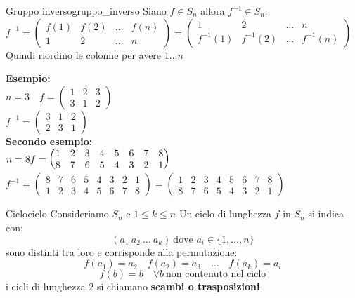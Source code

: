 \documentclass[12pt, letterpaper]{report}
\newcounter{definition}
\newcommand{\nmu}{}
\begin{document}
 		\begin{definition}{\nmu Gruppo inverso}{gruppo_inverso}
 			Siano $f \in S_n$ allora $f^{-1} \in S_n$. \\
 			$f^{-1} = \begin{pmatrix}
 				f(1) & f(2) & \dots & f(n) \\
 				1 & 2 & \dots & n
 			\end{pmatrix} = \begin{pmatrix}
 				1 & 2 & \dots & n \\
 				f^{-1}(1) & f^{-1}(2) & \dots & f^{-1}(n)
 			\end{pmatrix}$
 			Quindi riordino le colonne per avere $1 \dots n$
 		\end{definition}
 		\textbf{Esempio:}  \\
 		$n = 3 \quad f = \begin{pmatrix}
 			1 & 2 & 3 \\
 			3 & 1 & 2
 		\end{pmatrix}$ \\
 		$f^{-1} = \begin{pmatrix}
 			3 & 1 & 2 \\
 			2 & 3 & 1
 		\end{pmatrix}$ \\
 		\textbf{Secondo esempio: }\\
 		$n = 8 \\ f =\begin{pmatrix}
 			1 & 2 & 3 & 4 & 5 & 6 & 7 & 8 \\
 			8 & 7 & 6 & 5 & 4 & 3 & 2 & 1
 		\end{pmatrix}$ \\
 		$f^{-1} = \begin{pmatrix}
 			8 & 7 & 6 & 5 & 4 & 3 & 2 & 1 \\
 			1 & 2 & 3 & 4 & 5 & 6 & 7 & 8
 		\end{pmatrix} = \begin{pmatrix}
 		1 & 2 & 3 & 4 & 5 & 6 & 7 & 8 \\
 		8 & 7 & 6 & 5 & 4 & 3 & 2 & 1
 		\end{pmatrix}$
 		 \begin{definition}{\nmu Ciclo}{ciclo}
 		 	Consideriamo $S_n$ e $1 \leq k \leq n$
 			Un ciclo di lunghezza $f$ in $S_n$ si indica con:
 			\[
 			(a_1\ a_2\ \dots\ a_k)\ \text{dove $a_i \in \{1, \dots, n\}$}
 			\]
 			sono distinti tra loro e corrisponde alla permutazione:
 			\[
			f(a_1) =a_2 \quad f(a_2) = a_3 \quad \dots \quad f(a_k) = a_i
 			\]
 			\[
 			f(b) = b \quad \forall b\ \text{non contenuto nel ciclo}
 			\]
 			i cicli di lunghezza 2 si chiamano \textbf{scambi o trasposizioni}
 		\end{definition}
\end{document}
